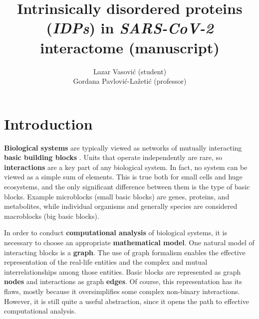 \documentclass[a4paper]{article}
\begin{document}
\title{Intrinsically disordered proteins (\textit{IDPs}) in \textit{SARS-CoV-2} interactome {\large (manuscript)}}

\author{Lazar Vasović {\small (student)}\\Gordana Pavlović-Lažetić {\small (professor)}}

\maketitle


\tableofcontents

\newpage

\section{Introduction}
\label{intro}

\textbf{Biological systems} are typically viewed as networks of mutually interacting \textbf{basic building blocks} \cite{junker, guzzi}. Units that operate independently are rare, so \textbf{interactions} are a key part of any biological system. In fact, no system can be viewed as a simple sum of elements. This is true both for small cells and huge ecosystems, and the only significant difference between them is the type of basic blocks. Example microblocks (small basic blocks) are genes, proteins, and metabolites, while individual organisms and generally species are considered macroblocks (big basic blocks).

In order to conduct \textbf{computational analysis} of biological systems, it is necessary to choose an appropriate \textbf{mathematical model}. One natural model of interacting blocks is a \textbf{graph}. The use of graph formalism enables the effective representation of the real-life entities and the complex and mutual interrelationships among those entities. Basic blocks are represented as graph \textbf{nodes} and interactions as graph \textbf{edges}. Of course, this representation has its flaws, mostly because it oversimplifies some complex non-binary interactions. However, it is still quite a useful abstraction, since it opens the path to effective computational analysis.
\end{document}
